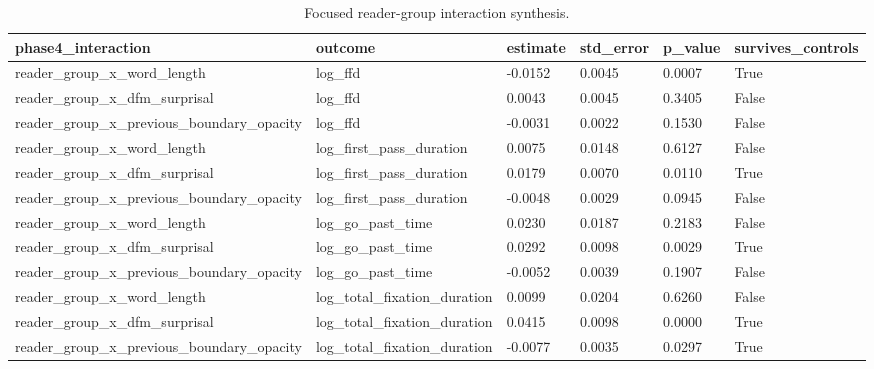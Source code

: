 \begin{table}[t]
\centering
\small
\caption{Focused reader-group interaction synthesis.}
\label{tab:interaction-synthesis}
\begin{tabular}{llllll}
\toprule
phase4\_interaction & outcome & estimate & std\_error & p\_value & survives\_controls \\
\midrule
reader\_group\_x\_word\_length & log\_ffd & -0.0152 & 0.0045 & 0.0007 & True \\
reader\_group\_x\_dfm\_surprisal & log\_ffd & 0.0043 & 0.0045 & 0.3405 & False \\
reader\_group\_x\_previous\_boundary\_opacity & log\_ffd & -0.0031 & 0.0022 & 0.1530 & False \\
reader\_group\_x\_word\_length & log\_first\_pass\_duration & 0.0075 & 0.0148 & 0.6127 & False \\
reader\_group\_x\_dfm\_surprisal & log\_first\_pass\_duration & 0.0179 & 0.0070 & 0.0110 & True \\
reader\_group\_x\_previous\_boundary\_opacity & log\_first\_pass\_duration & -0.0048 & 0.0029 & 0.0945 & False \\
reader\_group\_x\_word\_length & log\_go\_past\_time & 0.0230 & 0.0187 & 0.2183 & False \\
reader\_group\_x\_dfm\_surprisal & log\_go\_past\_time & 0.0292 & 0.0098 & 0.0029 & True \\
reader\_group\_x\_previous\_boundary\_opacity & log\_go\_past\_time & -0.0052 & 0.0039 & 0.1907 & False \\
reader\_group\_x\_word\_length & log\_total\_fixation\_duration & 0.0099 & 0.0204 & 0.6260 & False \\
reader\_group\_x\_dfm\_surprisal & log\_total\_fixation\_duration & 0.0415 & 0.0098 & 0.0000 & True \\
reader\_group\_x\_previous\_boundary\_opacity & log\_total\_fixation\_duration & -0.0077 & 0.0035 & 0.0297 & True \\
\bottomrule
\end{tabular}
\end{table}
